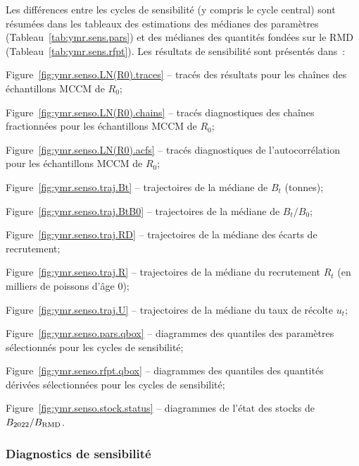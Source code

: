 \documentclass[11pt]{book}
\newcommand{\Bmsy}{B_\text{RMD}}
\begin{document}
Les diff\'{e}rences entre les cycles de sensibilit\'{e} (y compris le cycle central) sont r\'{e}sum\'{e}es dans les tableaux des estimations des m\'{e}dianes des param\`{e}tres (Tableau~\ref{tab:ymr.sens.pars}) et des m\'{e}dianes des quantit\'{e}s fond\'{e}es sur le RMD (Tableau~\ref{tab:ymr.sens.rfpt}).
Les r\'{e}sultats de sensibilit\'{e} sont pr\'{e}sent\'{e}s dans~:
\begin{itemize_csas}{}{}
  \item Figure~\ref{fig:ymr.senso.LN(R0).traces} -- trac\'{e}s des r\'{e}sultats pour les cha\^{i}nes des \'{e}chantillons MCCM de $R_0$;
  \item Figure~\ref{fig:ymr.senso.LN(R0).chains} -- trac\'{e}s diagnostiques des cha\^{i}nes fractionn\'{e}es pour les \'{e}chantillons MCCM de $R_0$;
  \item Figure~\ref{fig:ymr.senso.LN(R0).acfs} -- trac\'{e}s diagnostiques de l'autocorr\'{e}lation pour les \'{e}chantillons MCCM de $R_0$;
  \item Figure~\ref{fig:ymr.senso.traj.Bt} -- trajectoires de la m\'{e}diane de $B_t$ (tonnes);
  \item Figure~\ref{fig:ymr.senso.traj.BtB0} -- trajectoires de la m\'{e}diane de $B_t/B_0$;
  \item Figure~\ref{fig:ymr.senso.traj.RD} -- trajectoires de la m\'{e}diane des \'{e}carts de recrutement;
  \item Figure~\ref{fig:ymr.senso.traj.R} -- trajectoires de la m\'{e}diane du recrutement $R_t$ (en milliers de poissons d'\^{a}ge 0);
  \item Figure~\ref{fig:ymr.senso.traj.U} -- trajectoires de la m\'{e}diane du taux de r\'{e}colte $u_t$;
  \item Figure~\ref{fig:ymr.senso.pars.qbox} -- diagrammes des quantiles des param\`{e}tres s\'{e}lectionn\'{e}s pour les cycles de sensibilit\'{e};
  \item Figure~\ref{fig:ymr.senso.rfpt.qbox} -- diagrammes des quantiles des quantit\'{e}s d\'{e}riv\'{e}es s\'{e}lectionn\'{e}es pour les cycles de sensibilit\'{e};
  \item Figure~\ref{fig:ymr.senso.stock.status} -- diagrammes de l'\'{e}tat des stocks de $B_{\currYear}/\Bmsy$.
 \end{itemize_csas}

\subsubsection{Diagnostics de sensibilit\'{e}}
\end{document}
